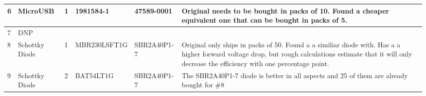 \begin{sidewaystable}
\begin{tabular}{|p{0.3cm}|p{2cm}|p{0.5cm}|l|l|p{5cm}|}
6       & MicroUSB               & 1        & 1981584-1             & 47589-0001            & Original needs to be bought in packs of 10. Found a cheaper equivalent one that can be bought in packs of 5.                                                                                                 \\ \hline
7       & DNP                    &          &                       &                       &                                                                                                                                                                                                              \\ \hline
8       & Schottky Diode         & 1        & MBR230LSFT1G          & SBR2A40P1-7           & Original only ships in packs of 50. Found a a similiar diode with. Has a a higher forward voltage drop, but rough calculations estimate that it will only decrease the efficiency with one percentage point. \\ \hline
9       & Schottky Diode         & 2        & BAT54LT1G             & SBR2A40P1-7           & The SBR2A40P1-7 diode is better in all aspects and 25 of them are already bought for \#8                                                                                                                     \\ \hline
\end{tabular}	
\end{sidewaystable}

